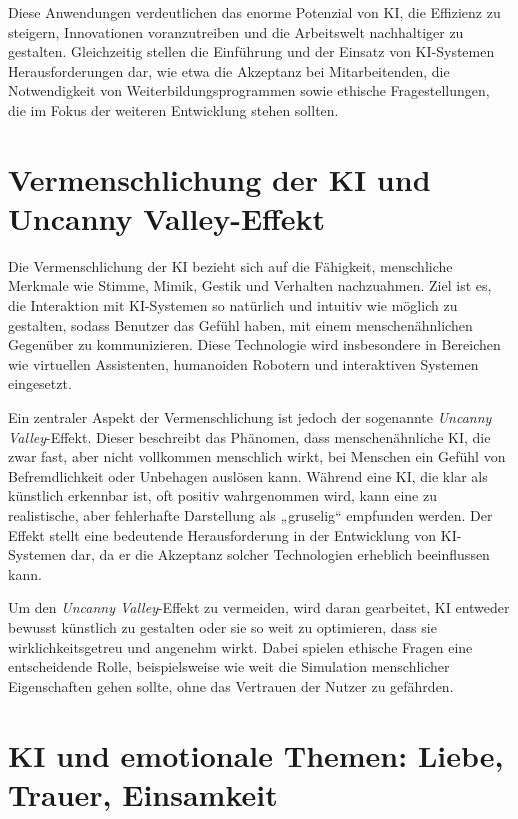 \documentclass[a4paper,12pt]{article}
\begin{document}
Diese Anwendungen verdeutlichen das enorme Potenzial von KI, die Effizienz zu steigern, Innovationen voranzutreiben und die Arbeitswelt nachhaltiger zu gestalten. Gleichzeitig stellen die Einführung und der Einsatz von KI-Systemen Herausforderungen dar, wie etwa die Akzeptanz bei Mitarbeitenden, die Notwendigkeit von Weiterbildungsprogrammen sowie ethische Fragestellungen, die im Fokus der weiteren Entwicklung stehen sollten.


\section{Vermenschlichung der KI und Uncanny Valley-Effekt}

Die Vermenschlichung der KI bezieht sich auf die Fähigkeit, menschliche Merkmale wie Stimme, Mimik, Gestik und Verhalten nachzuahmen. Ziel ist es, die Interaktion mit KI-Systemen so natürlich und intuitiv wie möglich zu gestalten, sodass Benutzer das Gefühl haben, mit einem menschenähnlichen Gegenüber zu kommunizieren. Diese Technologie wird insbesondere in Bereichen wie virtuellen Assistenten, humanoiden Robotern und interaktiven Systemen eingesetzt.

Ein zentraler Aspekt der Vermenschlichung ist jedoch der sogenannte \textit{Uncanny Valley}-Effekt. Dieser beschreibt das Phänomen, dass menschenähnliche KI, die zwar fast, aber nicht vollkommen menschlich wirkt, bei Menschen ein Gefühl von Befremdlichkeit oder Unbehagen auslösen kann. Während eine KI, die klar als künstlich erkennbar ist, oft positiv wahrgenommen wird, kann eine zu realistische, aber fehlerhafte Darstellung als „gruselig“ empfunden werden. Der Effekt stellt eine bedeutende Herausforderung in der Entwicklung von KI-Systemen dar, da er die Akzeptanz solcher Technologien erheblich beeinflussen kann.

Um den \textit{Uncanny Valley}-Effekt zu vermeiden, wird daran gearbeitet, KI entweder bewusst künstlich zu gestalten oder sie so weit zu optimieren, dass sie wirklichkeitsgetreu und angenehm wirkt. Dabei spielen ethische Fragen eine entscheidende Rolle, beispielsweise wie weit die Simulation menschlicher Eigenschaften gehen sollte, ohne das Vertrauen der Nutzer zu gefährden.


\section{KI und emotionale Themen: Liebe, Trauer, Einsamkeit}
\end{document}
